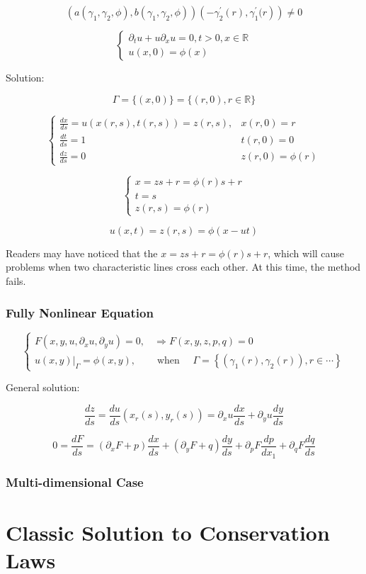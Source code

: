 $$
\left.\left(a\left(\gamma_{1}, \gamma_{2}, \phi\right), b\left(\gamma_{1}, \gamma_{2}, \phi\right)\right)\left(-\gamma_{2}^{\prime}(r), \gamma_{1}^{\prime}( r\right)\right) \neq 0
$$

\begin{example}
$$
\left\{\begin{array}{l}{\partial_t u+u \partial_x u=0, t>0, x\in\mathbb{R}} \\ {u(x,0)=\phi(x)}\end{array}\right.
$$

Solution:

$$
\Gamma=\{(x, 0)\}=\{(r, 0), r \in \mathbb{R}\}
$$

$$
\left\{\begin{array}{ll}{\frac{d x}{d s}=u(x(r, s), t(r, s))=z(r, s),} & {x(r, 0)=r} \\ {\frac{d t}{d s}=1} & {t(r, 0)=0} \\ {\frac{d z}{d s}=0} & {z(r, 0)=\phi(r)}\end{array}\right.
$$

$$
\left\{\begin{array}{l}{x=zs+r=\phi(r) s+r} \\ {t=s} \\ {z(r, s)=\phi(r)}\end{array}\right.
$$

$$
u(x, t)=z(r,s)=\phi(x-u t)
$$
\end{example}

Readers may have noticed that the $x=zs+r=\phi(r) s+r$, which will cause problems when two characteristic lines cross each other. At this time, the method fails.
\subsubsection{Fully Nonlinear Equation}
\begin{equation}
\left\{\begin{matrix}
F(x,y,u,\partial_x u,\partial_y u)=0, &\Longrightarrow F(x,y,z,p,q)=0 \\ 
\left.u(x, y)\right|_{\Gamma}=\phi(x, y), \quad &\text { when } \quad \Gamma=\left\{\left(\gamma_{1}(r), \gamma_{2}(r)\right), r \in \cdots\right\}
\end{matrix}\right.
\end{equation}

General solution:

$$
\frac{d z}{d s}=\frac{d u}{d s}(x_r(s), y_r(s))=\partial_x u \frac{d x}{d s}+\partial_y u\frac{d y}{d s}
$$

$$
0=\frac{dF}{ds}=\left(\partial_{x} F+p\right) \frac{d x}{d s}+\left(\partial_{y} F+ q\right) \frac{d y}{d s}+\partial_{p} F \frac{d p}{d x_{1}}+\partial_{q} F \frac{d q}{d s}
$$

\subsubsection{Multi-dimensional Case}


\section{Classic Solution to Conservation Laws}
